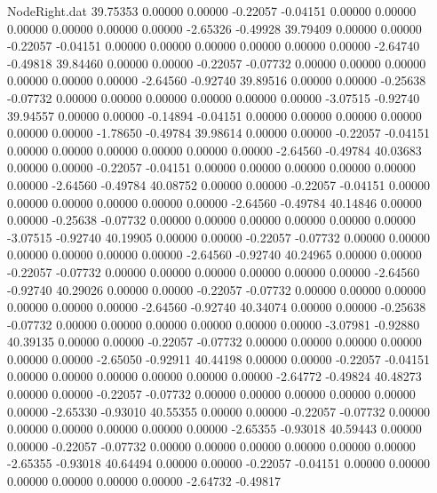\begin{filecontents}{NodeRight.dat}
  39.75353    0.00000    0.00000    -0.22057   -0.04151    0.00000    0.00000    0.00000    0.00000    0.00000    0.00000   -2.65326   -0.49928
  39.79409    0.00000    0.00000    -0.22057   -0.04151    0.00000    0.00000    0.00000    0.00000    0.00000    0.00000   -2.64740   -0.49818
  39.84460    0.00000    0.00000    -0.22057   -0.07732    0.00000    0.00000    0.00000    0.00000    0.00000    0.00000   -2.64560   -0.92740
  39.89516    0.00000    0.00000    -0.25638   -0.07732    0.00000    0.00000    0.00000    0.00000    0.00000    0.00000   -3.07515   -0.92740
  39.94557    0.00000    0.00000    -0.14894   -0.04151    0.00000    0.00000    0.00000    0.00000    0.00000    0.00000   -1.78650   -0.49784
  39.98614    0.00000    0.00000    -0.22057   -0.04151    0.00000    0.00000    0.00000    0.00000    0.00000    0.00000   -2.64560   -0.49784
  40.03683    0.00000    0.00000    -0.22057   -0.04151    0.00000    0.00000    0.00000    0.00000    0.00000    0.00000   -2.64560   -0.49784
  40.08752    0.00000    0.00000    -0.22057   -0.04151    0.00000    0.00000    0.00000    0.00000    0.00000    0.00000   -2.64560   -0.49784
  40.14846    0.00000    0.00000    -0.25638   -0.07732    0.00000    0.00000    0.00000    0.00000    0.00000    0.00000   -3.07515   -0.92740
  40.19905    0.00000    0.00000    -0.22057   -0.07732    0.00000    0.00000    0.00000    0.00000    0.00000    0.00000   -2.64560   -0.92740
  40.24965    0.00000    0.00000    -0.22057   -0.07732    0.00000    0.00000    0.00000    0.00000    0.00000    0.00000   -2.64560   -0.92740
  40.29026    0.00000    0.00000    -0.22057   -0.07732    0.00000    0.00000    0.00000    0.00000    0.00000    0.00000   -2.64560   -0.92740
  40.34074    0.00000    0.00000    -0.25638   -0.07732    0.00000    0.00000    0.00000    0.00000    0.00000    0.00000   -3.07981   -0.92880
  40.39135    0.00000    0.00000    -0.22057   -0.07732    0.00000    0.00000    0.00000    0.00000    0.00000    0.00000   -2.65050   -0.92911
  40.44198    0.00000    0.00000    -0.22057   -0.04151    0.00000    0.00000    0.00000    0.00000    0.00000    0.00000   -2.64772   -0.49824
  40.48273    0.00000    0.00000    -0.22057   -0.07732    0.00000    0.00000    0.00000    0.00000    0.00000    0.00000   -2.65330   -0.93010
  40.55355    0.00000    0.00000    -0.22057   -0.07732    0.00000    0.00000    0.00000    0.00000    0.00000    0.00000   -2.65355   -0.93018
  40.59443    0.00000    0.00000    -0.22057   -0.07732    0.00000    0.00000    0.00000    0.00000    0.00000    0.00000   -2.65355   -0.93018
  40.64494    0.00000    0.00000    -0.22057   -0.04151    0.00000    0.00000    0.00000    0.00000    0.00000    0.00000   -2.64732   -0.49817

\end{filecontents}
